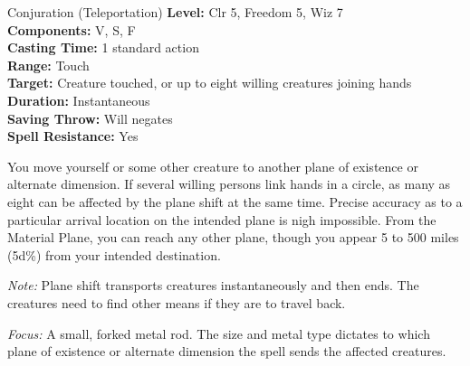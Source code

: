 {Conjuration (Teleportation)}
{
	\textbf{Level:}
	Clr 5, Freedom 5, Wiz 7\\
	\textbf{Components:}
	V, S, F\\
	\textbf{Casting Time:}
	1 standard action\\
	\textbf{Range:}
	Touch\\
	\textbf{Target:}
	Creature touched, or up to eight willing creatures joining hands\\
	\textbf{Duration:}
	Instantaneous\\
	\textbf{Saving Throw:}
	Will negates\\
	\textbf{Spell Resistance:}
	Yes\\
}
{
	You move yourself or some other creature to another plane of existence or alternate dimension. If several willing persons link hands in a circle, as many as eight can be affected by the plane shift at the same time. Precise accuracy as to a particular arrival location on the intended plane is nigh impossible. From the Material Plane, you can reach any other plane, though you appear 5 to 500 miles (5d\%) from your intended destination.

	\textit{Note:} Plane shift transports creatures instantaneously and then ends. The creatures need to find other means if they are to travel back.

	\textit{Focus:}
	A small, forked metal rod. The size and metal type dictates to which plane of existence or alternate dimension the spell sends the affected creatures.

}
